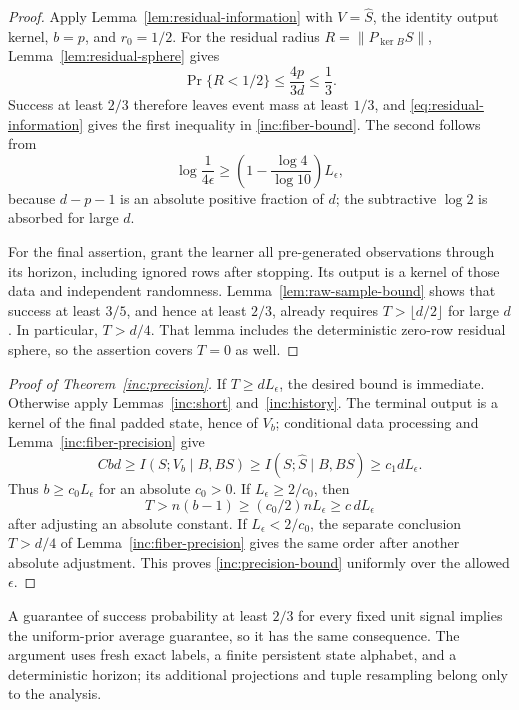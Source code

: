 \begin{proof}
Apply Lemma~\ref{lem:residual-information} with \(V=\widehat S\), the
identity output kernel, \(b=p\), and \(r_0=1/2\).  For the residual radius
\(R=\|P_{\ker B}S\|\), Lemma~\ref{lem:residual-sphere} gives
\[
 \Pr\{R<1/2\}\le\frac{4p}{3d}\le\frac13.
\]
Success at least \(2/3\) therefore leaves event mass at least \(1/3\),
and \eqref{eq:residual-information} gives the first inequality in
\eqref{inc:fiber-bound}.  The second follows from
\[
 \log\frac1{4\epsilon}
 \ge\left(1-\frac{\log4}{\log10}\right)L_\epsilon,
\]
because \(d-p-1\) is an absolute positive fraction of \(d\); the
subtractive \(\log2\) is absorbed for large \(d\).

For the final assertion, grant the learner all pre-generated observations
through its horizon, including ignored rows after stopping.  Its output
is a kernel of those data and independent randomness.  Lemma~\ref{lem:raw-sample-bound}
shows that success at least \(3/5\), and hence at least \(2/3\), already
requires \(T>\lfloor d/2\rfloor\) for large \(d\).  In particular,
\(T>d/4\).  That lemma includes the deterministic zero-row residual
sphere, so the assertion covers \(T=0\) as well.
\end{proof}

\begin{proof}[Proof of Theorem~\ref{inc:precision}]
If \(T\ge dL_\epsilon\), the desired bound is immediate.  Otherwise
apply Lemmas~\ref{inc:short} and~\ref{inc:history}.  The terminal output
is a kernel of the final padded state, hence of \(V_b\); conditional
data processing and Lemma~\ref{inc:fiber-precision} give
\[
 Cbd\ge I(S;V_b\mid B,BS)
 \ge I(S;\widehat S\mid B,BS)
 \ge c_1dL_\epsilon.
\]
Thus \(b\ge c_0L_\epsilon\) for an absolute \(c_0>0\).
If \(L_\epsilon\ge2/c_0\), then
\[
 T>n(b-1)\ge(c_0/2)nL_\epsilon\ge c\,dL_\epsilon
\]
after adjusting an absolute constant.  If \(L_\epsilon<2/c_0\), the
separate conclusion \(T>d/4\) of Lemma~\ref{inc:fiber-precision}
gives the same order after another absolute adjustment.  This proves
\eqref{inc:precision-bound} uniformly over the allowed \(\epsilon\).
\end{proof}

A guarantee of success probability at least \(2/3\) for every fixed
unit signal implies the uniform-prior average guarantee, so it has the
same consequence.  The argument uses fresh exact labels, a finite
persistent state alphabet, and a deterministic horizon; its additional
projections and tuple resampling belong only to the analysis.
